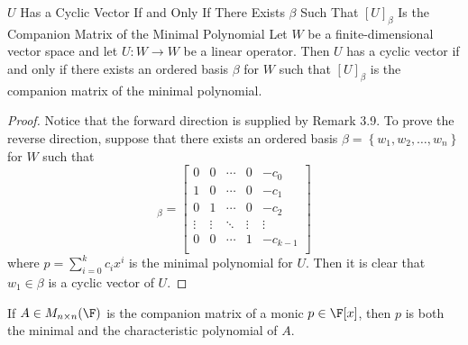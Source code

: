 \documentclass[linearalgebraII]{subfiles}
\begin{document}
    \clearpage
    \begin{theorem}{$U$ Has a Cyclic Vector If and Only If There Exists $\beta$ Such That $[U]_\beta$ Is the Companion Matrix of the Minimal Polynomial}
        Let $W$ be a finite-dimensional vector space and let $U:W\to W$ be a linear operator. Then $U$ has a cyclic vector if and only if there exists an ordered basis $\beta$ for $W$ such that $[U]_\beta$ is the companion matrix of the minimal polynomial.
    \end{theorem}

    \begin{proof}
        Notice that the forward direction is supplied by Remark 3.9. To prove the reverse direction, suppose that there exists an ordered basis $\beta = \left\lbrace w_1, w_2,\ldots, w_n \right\rbrace $ for $W$ such that
        \begin{equation*}
            [U]_\beta =
            \begin{bmatrix}
                0 & 0 & \cdots & 0 & -c_0 \\
                1 & 0 & \cdots & 0 & -c_1 \\
                0 & 1 & \cdots & 0 & -c_2 \\
                \vdots & \vdots & \ddots  & \vdots & \vdots \\
                0 & 0 & \cdots & 1 & -c_{k-1} \\
            \end{bmatrix}
        \end{equation*}
        where $p = \sum^{k}_{i=0} c_ix^i$ is the minimal polynomial for $U$. Then it is clear that $w_1\in\beta$ is a cyclic vector of $U$.
    \end{proof}

    \begin{cor}{}
        If $A\in M_{n\times n}(\F)$ is the companion matrix of a monic $p\in\F[x]$, then $p$ is both the minimal and the characteristic polynomial of $A$.
    \end{cor}	
\end{document}
